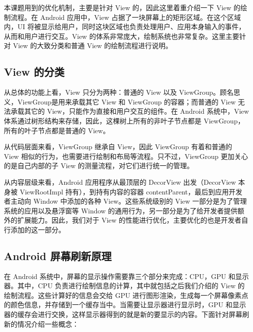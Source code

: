 本课题用到的优化机制，主要是针对 View 的，因此这里着重介绍一下 View 的绘制流程。在 Android 应用中，View 占据了一块屏幕上的矩形区域。在这个区域内，UI 将被显示给用户，同时这块区域也负责处理用户、应用本身输入的事件，从而和用户进行交互。View 的体系非常庞大，绘制系统也非常复杂。这里主要针对 View 的大致分类和普通 View 的绘制流程进行说明。

\subsection{View 的分类}

从总体的功能上看，View 只分为两种：普通的 View 以及 ViewGroup。顾名思义，ViewGroup是用来承载其它 View 和 ViewGroup 的容器；而普通的 View 无法承载其它的 View，只能作为直接和用户交互的组件。在 Android 系统中，View 体系通过树形结构来存储，因此，这棵树上所有的非叶子节点都是 ViewGroup，所有的叶子节点都是普通的 View。

从代码层面来看，ViewGroup 继承自 View，因此 ViewGroup 有着和普通的 View 相似的行为，也需要进行绘制和布局等流程。只不过，ViewGroup 更加关心的是自己内部的子 View 的测量流程，对它们进行统一的管理。

从内容层级来看，Android 应用程序从最顶层的 DecorView 出发（DecorView 本身被 ViewRootImpl 持有），到持有内容的容器 contentParent，最后到应用开发者主动向 Window 中添加的各种 View。这些系统级别的 View 一部分是为了管理系统的应用以及悬浮窗等 Window 的通用行为，另一部分是为了给开发者提供额外的扩展能力。因此，我们对于 View 的性能进行优化，主要优化的也是开发者自行添加的这一部分。

\subsection{Android 屏幕刷新原理}

在 Android 系统中，屏幕的显示操作需要靠三个部分来完成：CPU，GPU 和显示器。其中，CPU 负责进行绘制信息的计算，其中就包括之后我们介绍的 View 的绘制流程。这些计算好的信息会交给 GPU 进行图形渲染，生成每一个屏幕像素点的颜色信息，并存储到一个缓存当中。当需要让显示器进行显示时，GPU 和显示器的缓存会进行交换，这样显示器得到的就是新的要显示的内容。下面针对屏幕刷新的情况介绍一些概念：

